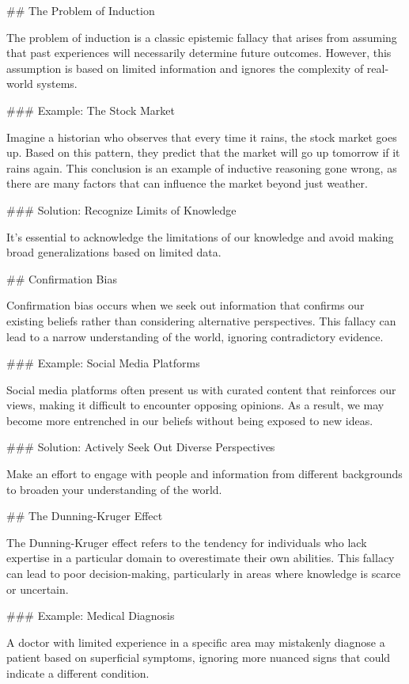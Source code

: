 \documentclass{report}%
\begin{document}
{{{{{{{{{{{{{{## The Problem of Induction

The problem of induction is a classic epistemic fallacy that arises from assuming that past experiences will necessarily determine future outcomes. However, this assumption is based on limited information and ignores the complexity of real-world systems.

### Example: The Stock Market

Imagine a historian who observes that every time it rains, the stock market goes up. Based on this pattern, they predict that the market will go up tomorrow if it rains again. This conclusion is an example of inductive reasoning gone wrong, as there are many factors that can influence the market beyond just weather.

### Solution: Recognize Limits of Knowledge

It's essential to acknowledge the limitations of our knowledge and avoid making broad generalizations based on limited data.

## Confirmation Bias

Confirmation bias occurs when we seek out information that confirms our existing beliefs rather than considering alternative perspectives. This fallacy can lead to a narrow understanding of the world, ignoring contradictory evidence.

### Example: Social Media Platforms

Social media platforms often present us with curated content that reinforces our views, making it difficult to encounter opposing opinions. As a result, we may become more entrenched in our beliefs without being exposed to new ideas.

### Solution: Actively Seek Out Diverse Perspectives

Make an effort to engage with people and information from different backgrounds to broaden your understanding of the world.

## The Dunning-Kruger Effect

The Dunning-Kruger effect refers to the tendency for individuals who lack expertise in a particular domain to overestimate their own abilities. This fallacy can lead to poor decision-making, particularly in areas where knowledge is scarce or uncertain.

### Example: Medical Diagnosis

A doctor with limited experience in a specific area may mistakenly diagnose a patient based on superficial symptoms, ignoring more nuanced signs that could indicate a different condition.

}}}}}}}}}}}}}}
\end{document}
